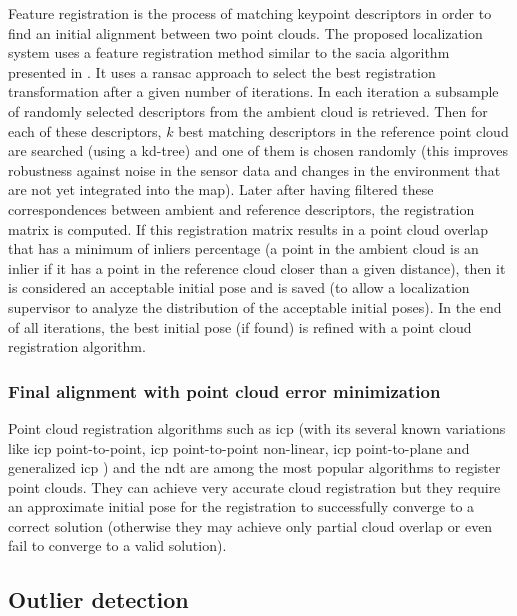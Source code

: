 Feature registration is the process of matching keypoint descriptors in order to find an initial alignment between two point clouds. The proposed localization system uses a feature registration method similar to the \gls{sacia} algorithm presented in \cite{Rusu2009}. It uses a \gls{ransac} approach to select the best registration transformation after a given number of iterations. In each iteration a subsample of randomly selected descriptors from the ambient cloud is retrieved. Then for each of these descriptors, $k$ best matching descriptors in the reference point cloud are searched (using a kd-tree) and one of them is chosen randomly (this improves robustness against noise in the sensor data and changes in the environment that are not yet integrated into the map). Later after having filtered these correspondences between ambient and reference descriptors, the registration matrix is computed. If this registration matrix results in a point cloud overlap that has a minimum of inliers percentage (a point in the ambient cloud is an inlier if it has a point in the reference cloud closer than a given distance), then it is considered an acceptable initial pose and is saved (to allow a localization supervisor to analyze the distribution of the acceptable initial poses). In the end of all iterations, the best initial pose (if found) is refined with a point cloud registration algorithm.


\subsubsection{Final alignment with point cloud error minimization}

Point cloud registration algorithms such as \gls{icp} \cite{Besl1992} (with its several known variations \cite{Rusinkiewicz2001,Pomerleau2013} like \gls{icp} point-to-point, \gls{icp} point-to-point non-linear, \gls{icp} point-to-plane and generalized \gls{icp} \cite{Segal2009}) and the \gls{ndt} \cite{Magnusson2009} are among the most popular algorithms to register point clouds. They can achieve very accurate cloud registration but they require an approximate initial pose for the registration to successfully converge to a correct solution (otherwise they may achieve only partial cloud overlap or even fail to converge to a valid solution).


\subsection{Outlier detection}

